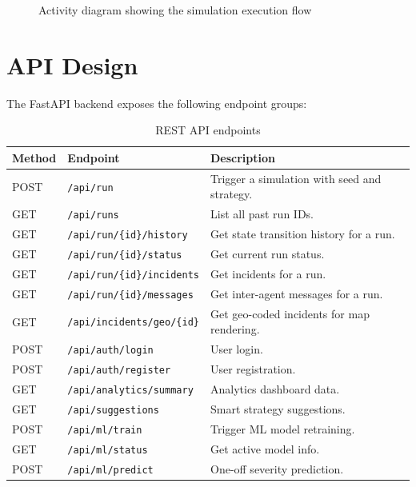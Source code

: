 \begin{figure}[H]
\centering
{}
\caption{Activity diagram showing the simulation execution flow}
\label{fig:activity_diagram}
\end{figure}

\section{API Design}
\label{sec:api_design}

The FastAPI backend exposes the following endpoint groups:

\begin{table}[H]
\centering
\caption{REST API endpoints}
\label{tab:api_endpoints}
\begin{tabularx}{\textwidth}{|l|l|X|}
\hline
\textbf{Method} & \textbf{Endpoint} & \textbf{Description} \\
\hline
POST & \texttt{/api/run} & Trigger a simulation with seed and strategy. \\
\hline
GET & \texttt{/api/runs} & List all past run IDs. \\
\hline
GET & \texttt{/api/run/\{id\}/history} & Get state transition history for a run. \\
\hline
GET & \texttt{/api/run/\{id\}/status} & Get current run status. \\
\hline
GET & \texttt{/api/run/\{id\}/incidents} & Get incidents for a run. \\
\hline
GET & \texttt{/api/run/\{id\}/messages} & Get inter-agent messages for a run. \\
\hline
GET & \texttt{/api/incidents/geo/\{id\}} & Get geo-coded incidents for map rendering. \\
\hline
POST & \texttt{/api/auth/login} & User login. \\
\hline
POST & \texttt{/api/auth/register} & User registration. \\
\hline
GET & \texttt{/api/analytics/summary} & Analytics dashboard data. \\
\hline
GET & \texttt{/api/suggestions} & Smart strategy suggestions. \\
\hline
POST & \texttt{/api/ml/train} & Trigger ML model retraining. \\
\hline
GET & \texttt{/api/ml/status} & Get active model info. \\
\hline
POST & \texttt{/api/ml/predict} & One-off severity prediction. \\

\end{tabularx}
\end{table}
